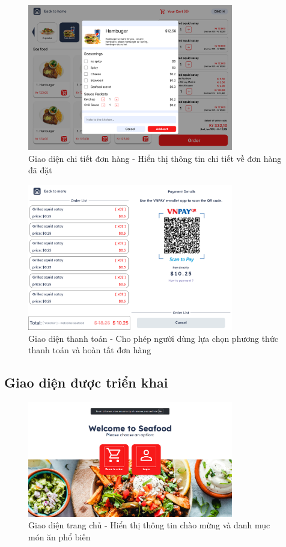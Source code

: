 \documentclass[a4paper]{article}
\begin{document}
\begin{itemize}
    \begin{figure}[H]
        \centering
        \includegraphics[width=0.8\textwidth]{figmaOrderDetail.png}
        \caption{Giao diện chi tiết đơn hàng - Hiển thị thông tin chi tiết về đơn hàng đã đặt}
    \end{figure}
    
    \begin{figure}[H]
        \centering
        \includegraphics[width=0.8\textwidth]{figmaPayment.png}
        \caption{Giao diện thanh toán - Cho phép người dùng lựa chọn phương thức thanh toán và hoàn tất đơn hàng}
    \end{figure}
    
    \subsection{Giao diện được triển khai}
    \begin{figure}[H]
        \centering
        \includegraphics[width=0.8\textwidth]{home.png}
        \caption{Giao diện trang chủ - Hiển thị thông tin chào mừng và danh mục món ăn phổ biến}
    \end{figure}
    

\end{itemize}
\end{document}
